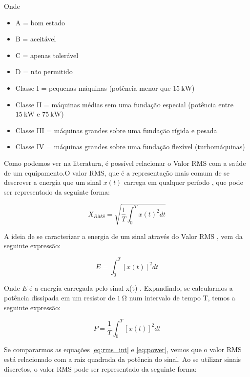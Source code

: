 \documentclass[a4paper]{ifacconf}
\begin{document}
Onde

\begin{itemize}
    \item A = bom estado
    \item B = aceitável
    \item C = apenas tolerável
    \item D = não permitido
    \item Classe I = pequenas máquinas (potência menor que $\SI{15}{\kilo\watt}$)
    \item Classe II = máquinas médias sem uma fundação especial (potência entre $\SI{15}{\kilo\watt}$ e $\SI{75}{\kilo\watt}$)
    \item Classe III = máquinas grandes sobre uma fundação rígida e pesada
    \item Classe IV = máquinas grandes sobre uma fundação flexível (turbomáquinas) 
\end{itemize}

Como podemos ver na literatura, é possível relacionar o Valor RMS com a saúde de um equipamento.O valor RMS, que é a representação mais comum 
de se descrever a energia que um sinal  $x(t)$ carrega em qualquer período \cite{Cryer2010}, que pode ser representado da seguinte forma:

\begin{equation}\label{eq:rms_int}
    X_{RMS} = \sqrt{\frac{1}{T}\int_{0}^{T}{x(t)^2dt}}
\end{equation}

A ideia de se caracterizar a energia de um sinal através do Valor RMS \cite{Cryer2010}, vem da seguinte expressão:

\begin{equation}\label{eq:energia}
    E = \int_{0}^{T}{[x(t)]^2dt}
\end{equation}

Onde $E$ é a energia carregada pelo sinal x(t) \cite{Oppenheim2016}. Expandindo, se calcularmos a potência dissipada em um resistor de
$\SI{1}{\ohm}$ num intervalo de tempo T, temos a seguinte expressão:

\begin{equation}\label{eq:power}
    P = \frac{1}{T}\int_{0}^{T}{[x(t)]^2dt}
\end{equation}

Se compararmos as equações \ref{eq:rms_int} e \ref{eq:power}, vemos que o valor RMS está relacionado com a raiz quadrada da potência do 
sinal. Ao se utilizar sinais discretos, o valor RMS pode ser representado da seguinte forma:
\end{document}
